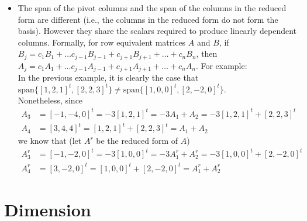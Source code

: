 \begin{itemize}
\begin{align*}
\begin{array}{@{}rrrr|r@{}}
        0 & 1 & 1 & 1 & 0
      \end{array}\right]
      \arrows3{}{}{R_3 + \frac{R_2}{2}}
      \left[\begin{array}{@{}rrrr|r@{}}
        1 & 2 & -1 & 3 & 0 \\
        0 & -2 & -2 & -2 & 0\\
        0 & 0 & 0 & 0 & 0
      \end{array}\right]
    \end{align*}
    Since $x_1$ and $x_2$ are pivot variables, the corresponding columns $A_1$ and $A_2$ form the basis\\
    $\{ [1, 2, 1]^t, [2, 2, 3]^t \}$.
  \item The span of the pivot columns and the span of the columns in the reduced form are different (i.e., the columns in the reduced form do not form the basis).
    However they share the scalars required to produce linearly dependent columns.
    Formally, for row equivalent matrices $A$ and $B$, if $B_j = c_1 B_1 + \ldots c_{j - 1} B_{j - 1} + c_{j + 1} B_{j + 1} + \ldots + c_n B_n$, then $A_j = c_1 A_1 + \ldots c_{j - 1} A_{j - 1} + c_{j + 1} A_{j + 1} + \ldots + c_n A_n$.
    For example:\\
    In the previous example, it is clearly the case that $\text{span} \{ [1, 2, 1]^t, [2, 2, 3]^t \} \neq \text{span} \{ [1, 0, 0]^t, [2, -2, 0]^t \}$.\\
    Nonetheless, since
    \begin{align*}
      A_3 &= [ -1 , -4, 0 ]^t = -3 [1, 2, 1]^t = -3 A_1 + A_2 = -3 [1, 2, 1]^t + [2, 2, 3]^t \\
      A_4 &= [3, 4, 4]^t = [1, 2, 1]^t + [2, 2, 3]^t = A_1 + A_2
    \end{align*}
    we know that (let $A^r$ be the reduced form of $A$)
    \begin{align*}
      A^r_3 &= [-1, -2, 0]^t = -3 [1, 0, 0]^t = -3 A^r_1 + A^r_2 = -3 [1, 0, 0]^t + [2, -2, 0]^t \\
      A^r_4 &= [3, -2, 0]^t = [1, 0, 0]^t + [2, -2, 0]^t = A^r_1 + A^r_2
    \end{align*}
\end{itemize}

\section{Dimension}

